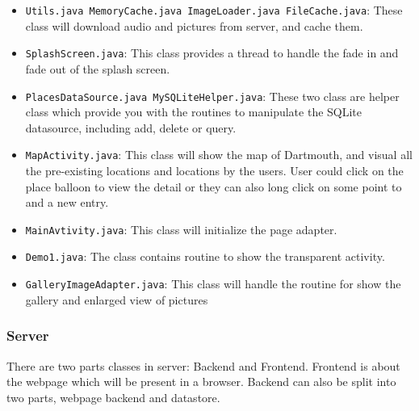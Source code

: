 \documentclass{article}
\begin{document}
\begin{itemize}
\item
\verb`Utils.java MemoryCache.java ImageLoader.java FileCache.java`:
These class will download audio and pictures from server, and cache them.

\item
\verb`SplashScreen.java`:
This class provides a thread to handle the fade in and fade out of the splash screen.

\item
\verb`PlacesDataSource.java MySQLiteHelper.java`:
These two class are helper class which provide you with the routines to manipulate the SQLite datasource, including add, delete or query.

\item
\verb`MapActivity.java`:
This class will show the map of Dartmouth, and visual all the pre-existing locations and locations by the users. User could click on the place balloon to view the detail or they can also long click on some point to and a new entry. 

\item
\verb`MainAvtivity.java`:
This class will initialize the page adapter.

\item
\verb`Demo1.java`:
The class contains routine to show the transparent activity.

\item
\verb`GalleryImageAdapter.java`:
This class will handle the routine for show the gallery and enlarged view of pictures


\end{itemize}


\subsubsection{Server}
There are two parts classes in server: Backend and Frontend. Frontend is about the webpage which will be present in a browser. Backend can also be split into two parts, webpage backend and datastore.
\end{document}
